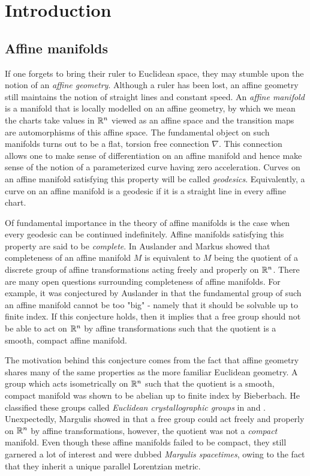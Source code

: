 \chapter*{Introduction}
\label{ch:introduction}
\section*{Affine manifolds}
If one forgets to bring their ruler to Euclidean space, they may stumble
upon the notion of an \emph{affine geometry}. Although a ruler has been lost,
an affine geometry still maintains the notion of straight lines and constant
speed. An \emph{affine manifold} is a manifold that is locally modelled on an
affine geometry, by which we mean the charts take values in $\mathbb{R}^n$ viewed as
an affine space and the transition maps are automorphisms of this affine space. The
fundamental object on such manifolds turns out to be a flat, torsion free
connection $\nabla$. This connection allows one to make sense of
differentiation on an affine manifold and hence make sense of the notion of a
parameterized curve having zero acceleration. Curves on an affine manifold
satisfying this property will be called \emph{geodesics}. Equivalently, a curve
on an affine manifold is a geodesic if it is a straight line in every affine
chart.

Of fundamental importance in the theory of affine manifolds is the case when
every geodesic can be continued indefinitely. Affine manifolds satisfying this
property are said to be \emph{complete}. In \cite{MarkusAuslander} Auslander
and Markus showed that completeness of an affine manifold $M$ is equivalent to
$M$ being the quotient of a discrete group of affine transformations acting
freely and properly on $\mathbb{R}^n$. There are many open questions surrounding
completeness of affine manifolds. For example, it was conjectured by Auslander
in \cite{AUSLANDER1964131} that the fundamental group of such an affine
manifold cannot be too "big" - namely that it should be solvable up to finite
index. If this conjecture holds, then it implies that a free group should not
be able to act on $\mathbb{R}^n$ by affine transformations such that the quotient is a
smooth, compact affine manifold.

The motivation behind this conjecture comes from the fact that affine geometry
shares many of the same properties as the more familiar Euclidean geometry. A
group which acts isometrically on $\mathbb{R}^n$ such that the quotient is a smooth,
compact manifold was shown to be abelian up to finite index by Bieberbach. He
classified these groups called \emph{Euclidean crystallographic groups} in
\cite{Bieberbach1910} and \cite{Bieberbach1912}. Unexpectedly, Margulis showed
in \cite{Margulis1983} that a free group could act freely and properly on
$\mathbb{R}^n$ by affine transformations, however, the quotient was not a
\emph{compact} manifold. Even though these affine manifolds failed to be
compact, they still garnered a lot of interest and were dubbed \emph{Margulis
    spacetimes}, owing to the fact that they inherit a unique parallel Lorentzian
metric.

